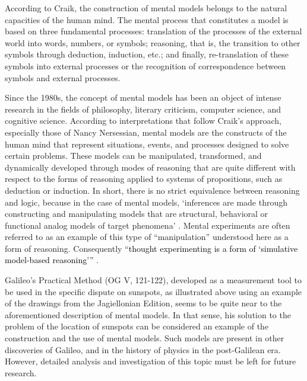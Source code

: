 \begin{artengenv}
According to Craik, the construction of mental models belongs to the natural capacities of the human mind. The mental
process that constitutes a model is based on three fundamental processes: translation of the processes of the external
world into words, numbers, or symbols; reasoning, that is, the transition to other symbols through deduction,
induction, etc.; and finally, re-translation of these symbols into external processes or the recognition of
correspondence between symbols and external processes.

Since the 1980s, the concept of mental models has been an object of intense research in the fields of philosophy,
literary criticism, computer science, and cognitive science. According to interpretations that follow Craik’s approach,
especially those of Nancy Nersessian, mental models are the constructs of the human mind that represent situations,
events, and processes designed to solve certain problems. These models can be manipulated, transformed, and dynamically
developed through modes of reasoning that are quite different with respect to the forms of reasoning applied to systems
of propositions, such as deduction or induction. In short, there is no strict equivalence between reasoning and logic,
because in the case of mental models, ‘inferences are made through constructing and manipulating models that are
structural, behavioral or functional analog models of target phenomena’
\parencite[p.184]{nersessian_creating_2008}.
Mental experiments are often referred to as an example of this type of ``manipulation'' understood here as a form
of reasoning. Consequently ``\textcolor{black}{thought experimenting is a form of ‘simulative model-based reasoning’''}
\parencite[p.291]{nersessian_theoreticians_1992}.

Galileo’s Practical Method (OG V, 121-122), developed as a measurement tool to be used in the specific dispute on
sunspots, as illustrated above using an example of the drawings from the Jagiellonian Edition, seems to be quite near
to the aforementioned description of mental models. In that sense, his solution to the problem of the location of
sunspots can be considered an example of the construction and the use of mental models. Such models are present in
other discoveries of Galileo, and in the history of physics in the post-Galilean era. However, detailed analysis and
investigation of this topic must be left for future research.




\end{artengenv}
